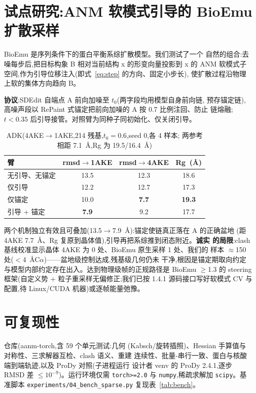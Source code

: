 \documentclass[11pt]{article}
\begin{document}
\section{试点研究:ANM 软模式引导的 BioEmu 扩散采样}
\label{sec:bioemu}

BioEmu\cite{lewis2025} 是序列条件下的蛋白平衡系综扩散模型。我们测试了一个
自然的组合:去噪每步后,把目标构象 B 相对当前结构 x 的形变向量投影到 x 的
ANM 软模式子空间,作为引导位移注入(即式~\ref{eq:step} 的方向、固定小步长),
使扩散过程沿物理上软的集体方向趋向 B。

\textbf{协议}:SDEdit 自端点 A 前向加噪至 $t_0$(两字段均用模型自身前向链,
预存锚定链),高噪声段以 RePaint 式锚定把前向加噪的 A 按 0.7 比例注回、防止
链熔融;$t<0.35$ 后引导接管。对照臂为同种子同初始化、仅关闭引导。

\begin{table}[htbp]
\centering
\caption{ADK(4AKE$\to$1AKE,214 残基,$t_0=0.6$,seed 0,各 4 样本;
两参考相距 7.1~\AA,Rg 为 19.5/16.4~\AA)}
\label{tab:bioemu}
\begin{tabular}{lccc}
\toprule
臂 & rmsd$\to$1AKE & rmsd$\to$4AKE & Rg~(\AA) \\
\midrule
无引导、无锚定 & 13.5 & 12.3 & 18.6 \\
仅引导 & 12.2 & 12.7 & 17.3 \\
仅锚定 & 10.0 & \textbf{7.7} & \textbf{19.3} \\
引导 + 锚定 & \textbf{7.9} & 9.2 & 17.7 \\
\bottomrule
\end{tabular}
\end{table}

两个机制独立有效且可叠加(13.5$\to$7.9~\AA):锚定使链真正落在 A 的正确盆地
(距 4AKE 7.7~\AA、Rg 复原到晶体值),引导再把系综推到闭态附近。\textbf{诚实
的局限}:clash 基线校准显示晶体 4AKE 为 0 处、BioEmu 原生采样 1 处、我们的
样本 $\approx$150 处($<$4~\AA C$\alpha$)——盆地级控制达成,残基级几何仍未
干净,根因是锚定期取向约定与模型内部约定存在出入。达到物理级帧的正规路径是
BioEmu $\geq$1.3 的 steering 框架(自定义势 + 粒子重采样无偏修正;我们已按
1.4.1 源码接口写好软模式 CV 与配置,待 Linux/CUDA 机器)或逐帧能量弛豫。

\section{可复现性}

仓库(aanm-torch,含 59 个单元测试:几何
(Kabsch/旋转插照)、Hessian 手算值与对称性、三求解器互检、clash 语义、重建
连续性、批量-串行一致、蛋白与核酸端到端轨迹,以及 ProDy 对照(子进程运行
设计者 venv 的 ProDy 2.4.1,逐步 RMSD 差 $\leq10^{-9}$)。运行环境仅需
\texttt{torch>=2.0} 与 \texttt{numpy},稀疏求解加 \texttt{scipy}。基准脚本
\texttt{experiments/04\_bench\_sparse.py} 复现表~\ref{tab:bench}。
\end{document}
